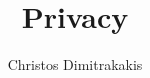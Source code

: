 \documentclass{beamer}
\title{Privacy}
\author[C. Dimitrakakis]{Christos Dimitrakakis}
\begin{document}
\begin{frame}
  \titlepage
\end{frame}


\end{document}
